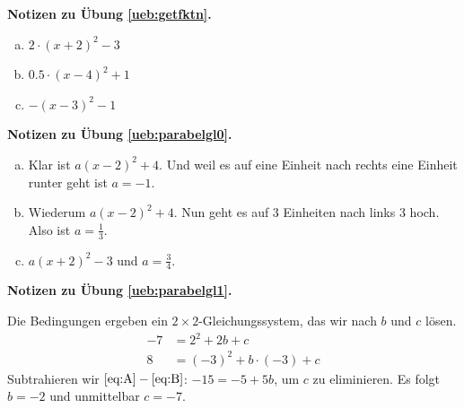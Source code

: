 \documentclass[%
11pt,%
twoside,%
titlepage,%
swissgerman,%
headsepline%
]{scrartcl}
\newcommand{\faReturnGray}{\textcolor{gray}{\faMailReply}} %
\theoremstyle{definition}
\theoremstyle{plain}
\newcommand{\concatueb}[1]{ueb:#1}%
\newcommand{\concatlsg}[1]{lsg:#1}%
\newenvironment{lsg}[1]{%
    \par\noindent\textbf{Notizen zu Übung \ref{\concatueb{#1}}.}%
    \label{\concatlsg{#1}} %
    \hfill\hyperref[\concatueb{#1}]{\faReturnGray}\par %
}{%
    \par%
}
\begin{document}
\begin{lsg}{getfktn}
    \begin{enumerate}[a)]
        \item $2\cdot(x+2)^2-3$
        \item $0.5\cdot(x-4)^2+1$
        \item $-(x-3)^2-1$
    \end{enumerate}
\end{lsg}
\begin{lsg}{parabelgl0}
\begin{enumerate}[a)]
\item  Klar ist $a(x-2)^2+4$. Und weil es auf eine Einheit nach rechts eine Einheit runter geht ist $a=-1$.
\item Wiederum $a(x-2)^2+4$. Nun geht es auf $3$ Einheiten nach links $3$ hoch. Also ist $a=\frac{1}{3}$.
\item  $a(x+2)^2-3$ und $a=\frac{3}{4}$.
\end{enumerate}
\end{lsg}
\begin{lsg}{parabelgl1}
    Die Bedingungen ergeben ein $2\times2$-Gleichungssystem, das wir nach $b$ und $c$ lösen.
    \begin{align}
        -7 &= 2^2+2b+c\label{eq:A}\\
        8 &= (-3)^2+b\cdot(-3)+c\label{eq:B}
    \end{align}
    Subtrahieren wir $\eqref{eq:A}-\eqref{eq:B}$: $-15 = -5+5b$, um $c$ zu eliminieren. Es folgt $b=-2$ und unmittelbar $c=-7$.
\end{lsg}
\end{document}
